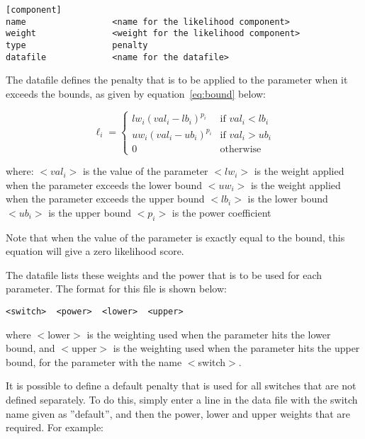 \documentclass[10pt,twoside]{book}
\begin{document}
{\small\begin{verbatim}
[component]
name                 <name for the likelihood component>
weight               <weight for the likelihood component>
type                 penalty
datafile             <name for the datafile>
\end{verbatim}}

The datafile defines the penalty that is to be applied to the parameter when it exceeds the bounds, as given by equation~\ref{eq:bound} below:

\begin{equation}\label{eq:bound}
\ell_{i} =
\begin{cases}
lw_{i} (val_{i} - lb_{i})^{p_{i}} & \textrm{if $val_{i} < lb_i$} \\
uw_{i} (val_{i} - ub_{i})^{p_{i}} & \textrm{if $val_{i} > ub_i$} \\
0 & \textrm{otherwise}
\end{cases}
\end{equation}

where:\newline
$<val_i>$ is the value of the parameter\newline
$<lw_i>$ is the weight applied when the parameter exceeds the lower bound\newline
$<uw_i>$ is the weight applied when the parameter exceeds the upper bound\newline
$<lb_i>$ is the lower bound\newline
$<ub_i>$ is the upper bound\newline
$<p_i>$ is the power coefficient\newline

Note that when the value of the parameter is exactly equal to the bound, this equation will give a zero likelihood score.

\bigskip
The datafile lists these weights and the power that is to be used for each parameter.  The format for this file is shown below:

{\small\begin{verbatim}
<switch>  <power>  <lower>  <upper>
\end{verbatim}}

where $<$lower$>$ is the weighting used when the parameter hits the lower bound, and $<$upper$>$ is the weighting used when the parameter hits the upper bound, for the parameter with the name $<$switch$>$.

\bigskip
It is possible to define a default penalty that is used for all switches that are not defined separately.  To do this, simply enter a line in the data file with the switch name given as ''default'', and then the power, lower and upper weights that are required.  For example:
\end{document}
